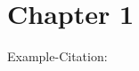 
\chapter{Chapter 1}
\label{chap:chapter1}

Example-Citation: \cite{Key_Template_InProceedings_Empty}